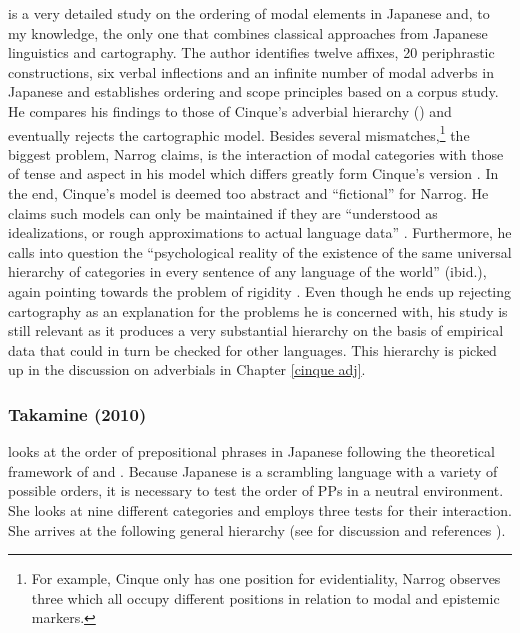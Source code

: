 \documentclass [output=book,colorlinks,citecolor=brown]{langscibook}
\begin{document}
\citet{narrog:2009:mod} is a very detailed study on the ordering of modal elements in Japanese and, to my knowledge, the only one that combines classical approaches from Japanese linguistics and cartography. The author identifies twelve affixes, 20 periphrastic constructions, six verbal inflections and an infinite number of modal adverbs in Japanese \citep[71–76]{narrog:2009:mod} and establishes ordering and scope principles based on a corpus study. He compares his findings to those of Cinque’s adverbial hierarchy (\citeyear{cinque:1999:adverbs}) and eventually rejects the cartographic model. Besides several mismatches,\footnote{For example, Cinque only has one position for evidentiality, Narrog observes three which all occupy different positions in relation to modal and epistemic markers.} the biggest problem, Narrog claims, is the interaction of modal categories with those of tense and aspect in his model which differs greatly form Cinque’s version \citep[233–234]{narrog:2009:mod}. In the end, Cinque’s model is deemed too abstract and ``fictional” for Narrog. He claims such models can only be maintained if they are ``understood as idealizations, or rough approximations to actual language data” \citep[243]{narrog:2009:mod}. Furthermore, he calls into question the ``psychological reality of the existence of the same universal hierarchy of categories in every sentence of any language of the world” (ibid.), again pointing towards the problem of rigidity \citep{larson:2021:rethinking}. Even though he ends up rejecting cartography as an explanation for the problems he is concerned with, his study is still relevant as it produces a very substantial hierarchy on the basis of empirical data that could in turn be checked for other languages. This hierarchy is picked up in the discussion on adverbials in Chapter \ref{cinque adj}. %

\subsubsection{Takamine (2010)} \label{takamine}

\citet{takamine:2010:hierarchy} looks at the order of prepositional phrases in Japanese following the theoretical framework of \citet{cinque:1999:adverbs, cinque:2006:complement} and \citet{schweikert:2005:order}. Because Japanese is a scrambling language with a variety of possible orders, it is necessary to test the order of PPs in a neutral environment. She looks at nine different categories and employs three tests for their interaction. She arrives at the following general hierarchy (see for discussion and references \citealt[58-83]{takamine:2010:hierarchy}).
\end{document}
